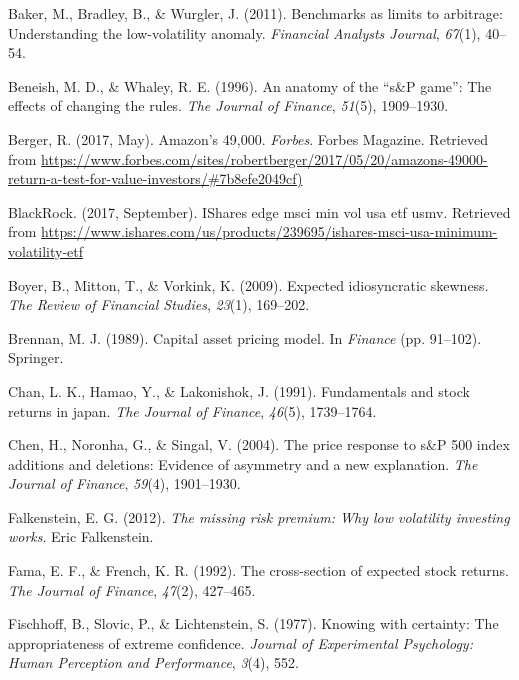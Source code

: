 \documentclass[12pt,twoside]{reedthesis}
\theoremstyle{definition}
\theoremstyle{definition}
\theoremstyle{definition}
\theoremstyle{remark}
\begin{document}
\hypertarget{ref-baker2011}{}
Baker, M., Bradley, B., \& Wurgler, J. (2011). Benchmarks as limits to
arbitrage: Understanding the low-volatility anomaly. \emph{Financial
Analysts Journal}, \emph{67}(1), 40--54.

\hypertarget{ref-beneish1996}{}
Beneish, M. D., \& Whaley, R. E. (1996). An anatomy of the ``s\&P
game'': The effects of changing the rules. \emph{The Journal of
Finance}, \emph{51}(5), 1909--1930.

\hypertarget{ref-berger2017}{}
Berger, R. (2017, May). Amazon's 49,000. \emph{Forbes}. Forbes Magazine.
Retrieved from
\url{https://www.forbes.com/sites/robertberger/2017/05/20/amazons-49000-return-a-test-for-value-investors/\#7b8efe2049cf)}

\hypertarget{ref-blackrock2017}{}
BlackRock. (2017, September). IShares edge msci min vol usa etf
\textbar{} usmv. Retrieved from
\url{https://www.ishares.com/us/products/239695/ishares-msci-usa-minimum-volatility-etf}

\hypertarget{ref-boyer2009}{}
Boyer, B., Mitton, T., \& Vorkink, K. (2009). Expected idiosyncratic
skewness. \emph{The Review of Financial Studies}, \emph{23}(1),
169--202.

\hypertarget{ref-brennan1989}{}
Brennan, M. J. (1989). Capital asset pricing model. In \emph{Finance}
(pp. 91--102). Springer.

\hypertarget{ref-chan1991}{}
Chan, L. K., Hamao, Y., \& Lakonishok, J. (1991). Fundamentals and stock
returns in japan. \emph{The Journal of Finance}, \emph{46}(5),
1739--1764.

\hypertarget{ref-chen2004}{}
Chen, H., Noronha, G., \& Singal, V. (2004). The price response to s\&P
500 index additions and deletions: Evidence of asymmetry and a new
explanation. \emph{The Journal of Finance}, \emph{59}(4), 1901--1930.

\hypertarget{ref-falkenstein2012}{}
Falkenstein, E. G. (2012). \emph{The missing risk premium: Why low
volatility investing works}. Eric Falkenstein.

\hypertarget{ref-fama1992}{}
Fama, E. F., \& French, K. R. (1992). The cross-section of expected
stock returns. \emph{The Journal of Finance}, \emph{47}(2), 427--465.

\hypertarget{ref-fischhoff1977}{}
Fischhoff, B., Slovic, P., \& Lichtenstein, S. (1977). Knowing with
certainty: The appropriateness of extreme confidence. \emph{Journal of
Experimental Psychology: Human Perception and Performance}, \emph{3}(4),
552.
\end{document}
